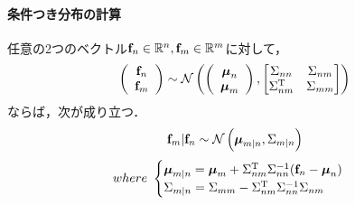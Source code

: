\documentclass[11pt,a4j]{jarticle}
\begin{document}
    \paragraph{条件つき分布の計算}
      任意の2つのベクトル${\bf f}_n \in \mathbb{R}^{n}, {\bf f}_m \in \mathbb{R}^{m}$に対して，
      \begin{align}
        \left(
          \begin{array}{c}
            {\bf f}_n \\ {\bf f}_m
          \end{array}
        \right)
        \sim
        \mathcal{N} 
        \left(
          \left(
            \begin{array}{c}
              {\boldsymbol \mu}_n \\ {\boldsymbol \mu}_m
            \end{array}
          \right)
          ,
          \begin{bmatrix}
            \Sigma_{nn} & \Sigma_{nm} \\
            \Sigma_{nm}^{\mathrm{T}} & \Sigma_{mm}
          \end{bmatrix}
        \right)
      \end{align}
      ならば，次が成り立つ．
      \begin{align}
        {\bf f}_m | {\bf f}_n \sim \mathcal{N}\left( {\boldsymbol \mu}_{m|n}, \Sigma_{m|n} \right) \label{form:gaussian_conditional}  
      \end{align}
      \begin{align}          
        where ~ 
        \begin{cases}
          {\boldsymbol \mu}_{m|n} = {\boldsymbol \mu}_{m} + \Sigma_{nm}^{\mathrm{T}} \Sigma_{nn}^{-1} ( {\bf f}_n - {\boldsymbol \mu}_{n} ) \\
          \Sigma_{m|n} = \Sigma_{mm} - \Sigma_{nm}^{\mathrm{T}} \Sigma_{nn}^{-1} \Sigma_{nm}
        \end{cases} \nonumber
      \end{align}
\end{document}
